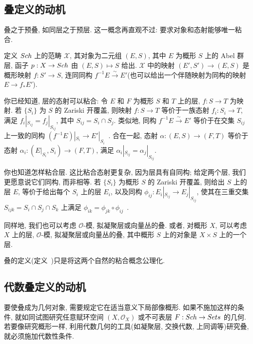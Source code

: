 \subsection{叠定义的动机}\label{src:1.6.2-subsection}
叠之于预叠, 如同层之于预层. 这一概念再直观不过: 要求对象和态射能够唯一粘合.
\begin{example}[层的模叠]\label{src:1.6.4}
定义 $Sch$ 上的范畴 $\mathcal X$, 其对象为二元组 $(E,S)$, 其中 $E$ 为概形 $S$ 上的 Abel 群层, 函子 $p:X\to Sch$ 由 $(E,S)\mapsto S$ 给出. $\mathcal X$ 中的映射 $(E',S')\to(E,S)$ 是概形映射 $f:S'\to S$, 连同同构 $f^{-1}E\xrightarrow{\sim}E'$(也可以给出一个伴随映射为同构的映射 $E\to f_*E'$).
\end{example}
你已经知道, 层的态射可以粘合: 令 $E$ 和 $F$ 为概形 $S$ 和 $T$ 上的层, $f:S\to T$ 为映射. 若 $\{S_i\}$ 为 $S$ 的 Zariski 开覆盖, 则映射 $f:S\to T$ 等价于一族态射 $f_i:S_i\to T$, 满足 $f_i|_{S_{ij}}=f_j|_{S_{ij}}$, 其中 $S_{ij}=S_i\cap S_j$. 类似地, 同构 $f^{-1}E\xrightarrow{\sim}E'$ 等价于在交集 $S_{ij}$ 上一致的同构 $(f^{-1}E)|_{S_i}\to E'|_{S_i}$~\cite[习题 II.1.15]{Har77}. 合在一起, 态射 $\alpha:(E,S)\to(F,T)$ 等价于态射 $\alpha_i:(E|_{S_i},S_i)\to(F,T)$, 满足 $\alpha_i|_{S_{ij}}=\alpha_j|_{S_{ij}}$.

你也知道怎样粘合层. 这比粘合态射更复杂, 因为层具有自同构; 给定两个层, 我们更愿意说它们同构, 而非相等. 若 $\{S_i\}$ 为概形 $S$ 的 Zariski 开覆盖, 则给出 $S$ 上的层 $E$, 等价于给出每个 $S_i$ 上的层 $E_i$, 以及同构 $\phi_{ij}:E_i|_{S_{ij}}\to E_j|_{S_{ij}}$, 使其在三重交集 $S_{ijk}=S_i\cap S_j\cap S_k$ 上满足 $\phi_{ik}=\phi_{jk}\circ\phi_{ij}$~\cite[习题 II.1.22]{Har77}.

同样地, 我们也可以考虑 $\mathcal O$-模, 拟凝聚层或向量丛的叠. 或者, 对概形 $X$, 可以考虑 $X$ 上的层, $\mathcal O$-模, 拟凝聚层或向量丛的叠, 其中概形 $S$ 上的对象是 $X\times S$ 上的一个层.

叠的定义(定义~)只是将这两个自然的粘合概念公理化.

\subsection{代数叠定义的动机}\label{src:1.6.3-subsection}
要使叠成为几何对象, 需要规定它在适当意义下局部像概形. 如果不施加这样的条件, 就如同试图研究任意赋环空间 $(X,\mathcal O_X)$ 或不可表层 $F:Sch\to Sets$ 的几何. 若要像研究概形一样, 利用代数几何的工具(如凝聚层, 交换代数, 上同调等)研究叠, 就必须施加代数性条件.


